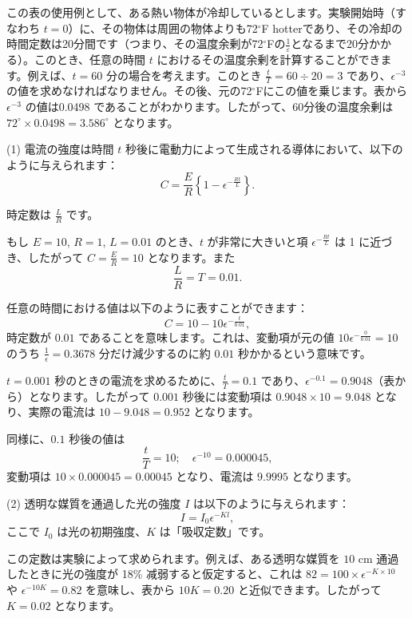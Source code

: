 \documentclass[a4paper,11pt,openany]{ltjsbook}
\begin{document}
\begin{enumerate}
この表の使用例として、ある熱い物体が冷却しているとします。実験開始時（すなわち \( t = 0 \)）に、その物体は周囲の物体よりも72$^\circ$F hotterであり、その冷却の時間定数は20分間です（つまり、その温度余剰が72$^\circ$Fの\(\frac{1}{ε}\)となるまで20分かかる）。このとき、任意の時間 \( t \) におけるその温度余剰を計算することができます。例えば、\( t = 60 \) 分の場合を考えます。このとき \(\frac{t}{T} = 60 ÷ 20 = 3\) であり、\(\epsilon^{-3}\) の値を求めなければなりません。その後、元の72$^\circ$Fにこの値を乗じます。表から \(\epsilon^{-3}\) の値は0.0498 であることがわかります。したがって、60分後の温度余剰は \( 72^\circ \times  0.0498 = 3.586^\circ \) となります。

(1) 電流の強度は時間 \( t \) 秒後に電動力によって生成される導体において、以下のように与えられます：
\[
 C = \frac{E}{R} \left\{ 1 - \epsilon^{-\frac{Rt}{L}} \right\}. 
\]

時定数は \(\frac{L}{R}\) です。

もし \( E = 10 \), \( R = 1 \), \( L = 0.01 \) のとき、\( t \) が非常に大きいと項 \(\epsilon^{-\frac{Rt}{L}}\) は 1 に近づき、したがって \( C = \frac{E}{R} = 10 \) となります。また
\[
 \frac{L}{R} = T = 0.01. 
\]

任意の時間における値は以下のように表すことができます：
\[
 C = 10 - 10\epsilon^{-\frac{t}{0.01}}, 
\]
時定数が \( 0.01 \) であることを意味します。これは、変動項が元の値 \( 10\epsilon^{-\frac{0}{0.01}} = 10 \) のうち \(\frac{1}{\epsilon} = 0.3678\) 分だけ減少するのに約 \( 0.01 \) 秒かかるという意味です。

\( t = 0.001 \) 秒のときの電流を求めるために、\(\frac{t}{T} = 0.1\) であり、\(\epsilon^{-0.1} = 0.9048\)（表から）となります。したがって \( 0.001 \) 秒後には変動項は \( 0.9048 \times  10 = 9.048 \) となり、実際の電流は \( 10 - 9.048 = 0.952 \) となります。

同様に、\( 0.1 \) 秒後の値は
\[
 \frac{t}{T} = 10; \quad \epsilon^{-10} = 0.000045, 
\]
変動項は \( 10 \times  0.000045 = 0.00045 \) となり、電流は \( 9.9995 \) となります。

(2) 透明な媒質を通過した光の強度 \( I \) は以下のように与えられます：
\[
 I = I_0\epsilon^{-Kl}, 
\]
ここで \( I_0 \) は光の初期強度、\( K \) は「吸収定数」です。

この定数は実験によって求められます。例えば、ある透明な媒質を \( 10 \) cm 通過したときに光の強度が 18\% 减弱すると仮定すると、これは \( 82 = 100 \times  \epsilon^{-K\times 10} \) や \(\epsilon^{-10K} = 0.82\) を意味し、表から \( 10K = 0.20 \) と近似できます。したがって \( K = 0.02 \) となります。


\end{enumerate}
\end{document}
